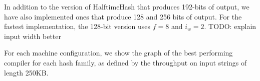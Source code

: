 \documentclass[acmsmall, nonacm]{acmart}
\begin{document}




In addition to the version of HalftimeHash that produces 192-bits of output, we have also implemented ones that produce 128 and 256 bits of output.
For the fastest implementation, the 128-bit version uses $f = 8$ and $i_w = 2$.
TODO: explain input width better


For each machine configuration, we show the graph of the best performing compiler for each hash family, as defined by the throughput on input strings of length 250KB.

\end{document}
